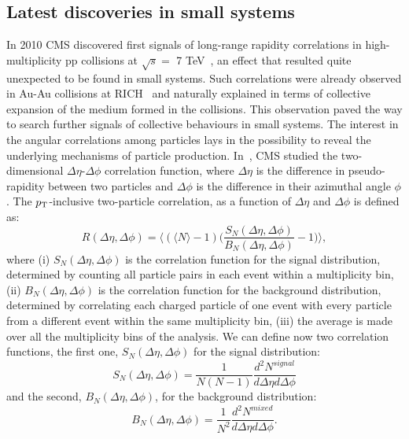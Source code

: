 \subsection{Latest discoveries in small systems}
In 2010 CMS discovered first signals of long-range rapidity correlations in 
high-multiplicity pp collisions at $\sqrt{s} = $ 7 TeV~\cite{Khachatryan:2010gv}, an effect that 
resulted quite unexpected to be found in small systems. Such correlations
were already observed in Au-Au collisions at RICH~\cite{Alver:2008aa,Alver:2009id,Abelev:2009jv}
and naturally explained in terms of collective expansion of the medium formed in the collisions.
This observation paved the way to search further signals of collective 
behaviours in small systems. 
The interest in the angular correlations among particles lays in the possibility 
to reveal the underlying mechanisms of particle production. In~\cite{Khachatryan:2010gv}, 
CMS studied the two-dimensional $\Delta \eta$-$\Delta \phi$ correlation 
function, where $\Delta \eta$ is the difference in pseudo-rapidity between 
two particles and $\Delta \phi$ is the difference in their azimuthal angle $\phi$. The $p_{\rm T}$-inclusive two-particle 
correlation, as a function of $\Delta \eta$ and $\Delta \phi$ is defined as:
\begin{equation}
\label{CorrelationFnc}
R(\Delta \eta,\Delta \phi) = \Big \langle (\langle N \rangle -1) \Big (\frac{S_N(\Delta \eta,\Delta \phi)}{B_N(\Delta \eta,\Delta \phi)} -1\Big )\Big \rangle,
\end{equation}
where (i) $S_N(\Delta \eta,\Delta \phi)$ is the correlation function for the signal distribution,
determined by counting all particle pairs in each event within a multiplicity bin, 
(ii) $B_N(\Delta \eta,\Delta \phi)$ is the correlation function for the background distribution, determined
  by correlating each charged particle of one event with every particle from 
a different event within the same multiplicity bin, (iii) the average is made over all the multiplicity bins of the analysis.
\iffalse
We can define now two correlation functions, the first one, $S_N(\Delta \eta,\Delta \phi)$ for the signal distribution:
\begin{equation}
\label{SignalDistribution}
S_N(\Delta \eta,\Delta \phi) = \frac{1}{N(N-1)}\frac{d^2N^{signal}}{d\Delta \eta d\Delta \phi}
\end{equation}
and the second, $B_N(\Delta \eta,\Delta \phi)$, for the background distribution:
\begin{equation}
\label{BkgDistribution}
B_N(\Delta \eta,\Delta \phi) = \frac{1}{N^2}\frac{d^2N^{mixed}}{d\Delta \eta d\Delta \phi}.
\end{equation}
